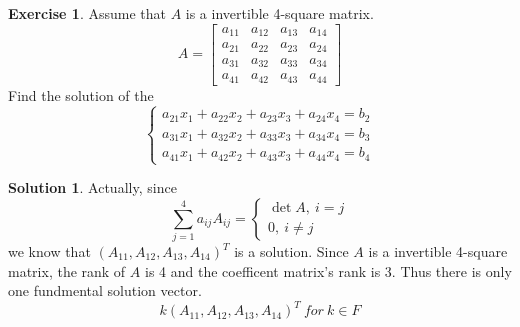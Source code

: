 \documentclass{article}
\theoremstyle{definition}
\newtheorem{exercise}{Exercise}[section]
\newtheorem{solution}{Solution}[exercise]
\begin{document}
\begin{exercise}
    Assume that $A$ is a invertible 4-square matrix.
    $$
    A=
    \begin{bmatrix}
        a_{11} & a_{12} & a_{13} & a_{14}\\
        a_{21} & a_{22} & a_{23} & a_{24}\\
        a_{31} & a_{32} & a_{33} & a_{34}\\
        a_{41} & a_{42} & a_{43} & a_{44}
    \end{bmatrix}
    $$
    Find the solution of the 
    $$
    \begin{cases}
        a_{21}x_{1}+a_{22}x_{2}+a_{23}x_{3}+a_{24}x_{4}=b_{2}\\
        a_{31}x_{1}+a_{32}x_{2}+a_{33}x_{3}+a_{34}x_{4}=b_{3}\\
        a_{41}x_{1}+a_{42}x_{2}+a_{43}x_{3}+a_{44}x_{4}=b_{4}
    \end{cases}
    $$
\end{exercise}

\begin{solution}
    Actually, since 
    $$\sum_{j=1}^{4}a_{ij}A_{ij}=\begin{cases}
        \det A,\ i=j\\
        0,\ i\neq j\end{cases}$$
    we know that $(A_{11},A_{12},A_{13},A_{14})^{T}$ is a solution.
    Since $A$ is a invertible 4-square matrix, the rank of $A$ is 4 and 
    the coefficent matrix's rank is 3. Thus there is only one fundmental solution 
    vector.
    $$k(A_{11},A_{12},A_{13},A_{14})^{T}\ for\ k\in F$$
\end{solution}
\end{document}
